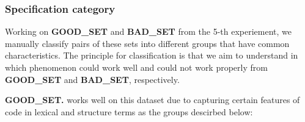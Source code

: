 
\subsubsection{Specification category}
Working on \textbf{GOOD\_SET} and \textbf{BAD\_SET} from the 5-th experiement, we manually classify pairs of these sets into different groups that have common characteristics.
The principle for classification is that we aim to understand in which phenomenon {\model} could work well and could not work properly from \textbf{GOOD\_SET} and \textbf{BAD\_SET}, respectively.


\textbf{GOOD\_SET.} {\model} works well on this dataset due to capturing certain features of code in lexical and structure terms as the groups descirbed below:

